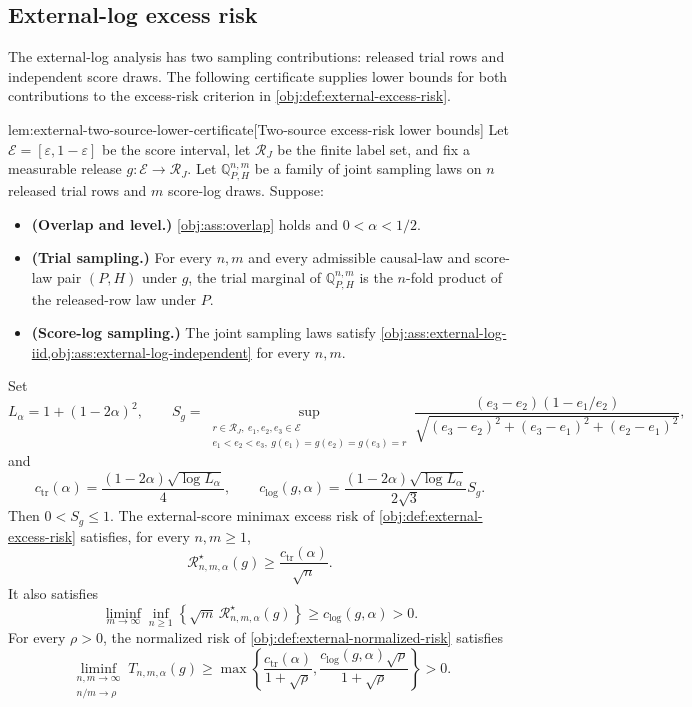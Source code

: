 \subsection{External-log excess risk}

The external-log analysis has two sampling contributions: released trial rows and independent score draws. The following certificate supplies lower bounds for both contributions to the excess-risk criterion in \cref{obj:def:external-excess-risk}.

\begin{lemmav}{lem:external-two-source-lower-certificate}[Two-source excess-risk lower bounds]
Let \(\mathcal E=[\varepsilon,1-\varepsilon]\) be the score interval, let \(\mathcal R_J\) be the finite label set, and fix a measurable release \(g:\mathcal E\to\mathcal R_J\). Let \(\mathbb Q_{P,H}^{n,m}\) be a family of joint sampling laws on \(n\) released trial rows and \(m\) score-log draws. Suppose:

\begin{itemize}
\item \textbf{(Overlap and level.)} \cref{obj:ass:overlap} holds and \(0<\alpha<1/2\).
\item \textbf{(Trial sampling.)} For every \(n,m\) and every admissible causal-law and score-law pair \((P,H)\) under \(g\), the trial marginal of \(\mathbb Q_{P,H}^{n,m}\) is the \(n\)-fold product of the released-row law under \(P\).
\item \textbf{(Score-log sampling.)} The joint sampling laws satisfy \cref{obj:ass:external-log-iid,obj:ass:external-log-independent} for every \(n,m\).
\end{itemize}

Set
\[
L_\alpha=1+(1-2\alpha)^2,\qquad
S_g=\sup_{\substack{r\in\mathcal R_J,\ e_1,e_2,e_3\in\mathcal E\\
e_1<e_2<e_3,\ g(e_1)=g(e_2)=g(e_3)=r}}
\frac{(e_3-e_2)(1-e_1/e_2)}
{\sqrt{(e_3-e_2)^2+(e_3-e_1)^2+(e_2-e_1)^2}},
\]
and
\[
c_{\mathrm{tr}}(\alpha)
=\frac{(1-2\alpha)\sqrt{\log L_\alpha}}{4},
\qquad
c_{\mathrm{log}}(g,\alpha)
=\frac{(1-2\alpha)\sqrt{\log L_\alpha}}{2\sqrt{3}}S_g.
\]
Then \(0<S_g\leq 1\). The external-score minimax excess risk of \cref{obj:def:external-excess-risk} satisfies, for every \(n,m\geq 1\),
\[
\mathcal R^\star_{n,m,\alpha}(g)
\geq \frac{c_{\mathrm{tr}}(\alpha)}{\sqrt n}.
\]
It also satisfies
\[
\liminf_{m\to\infty}\inf_{n\geq 1}
\left\{\sqrt m\,\mathcal R^\star_{n,m,\alpha}(g)\right\}
\geq c_{\mathrm{log}}(g,\alpha)>0.
\]
For every \(\rho>0\), the normalized risk of \cref{obj:def:external-normalized-risk} satisfies
\[
\liminf_{\substack{n,m\to\infty\\ n/m\to\rho}}
T_{n,m,\alpha}(g)
\geq
\max\left\{
\frac{c_{\mathrm{tr}}(\alpha)}{1+\sqrt\rho},
\frac{c_{\mathrm{log}}(g,\alpha)\sqrt\rho}{1+\sqrt\rho}
\right\}>0.
\]
\end{lemmav}


